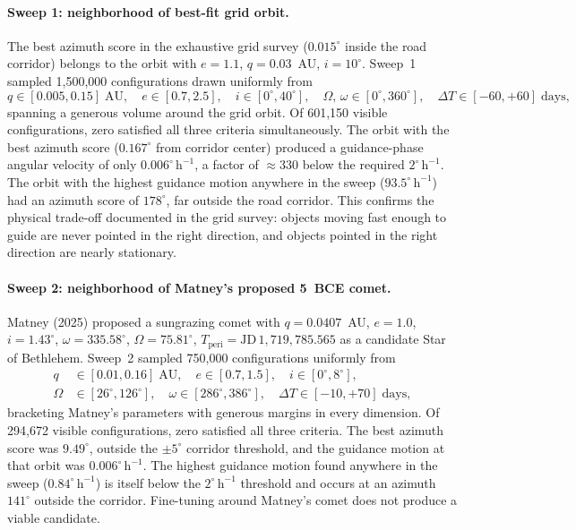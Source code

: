 \documentclass[11pt,a4paper]{article}
\begin{document}
\paragraph{Sweep 1: neighborhood of best-fit grid orbit.}
The best azimuth score in the exhaustive grid survey ($0.015^\circ$
inside the road corridor) belongs to the orbit with $e=1.1$,
$q=0.03$~AU, $i=10^\circ$.
Sweep~1 sampled 1,500,000 configurations drawn uniformly from
\begin{equation}
  q \in [0.005, 0.15]\;\text{AU},\quad
  e \in [0.7, 2.5],\quad
  i \in [0^\circ, 40^\circ],\quad
  \Omega,\,\omega \in [0^\circ, 360^\circ],\quad
  \Delta T \in [-60, +60]\;\text{days},
\end{equation}
spanning a generous volume around the grid orbit.
Of 601,150 visible configurations, zero satisfied all three criteria
simultaneously.
The orbit with the best azimuth score ($0.167^\circ$ from corridor
center) produced a guidance-phase angular velocity of only
$0.006^\circ\,\mathrm{h}^{-1}$, a factor of ${\approx}330$ below the
required $2^\circ\,\mathrm{h}^{-1}$.
The orbit with the highest guidance motion anywhere in the sweep
($93.5^\circ\,\mathrm{h}^{-1}$) had an azimuth score of
$178^\circ$, far outside the road corridor.
This confirms the physical trade-off documented in the grid survey:
objects moving fast enough to guide are never pointed in the right
direction, and objects pointed in the right direction are nearly
stationary.

\paragraph{Sweep 2: neighborhood of Matney's proposed 5~BCE comet.}
Matney (2025)\nocite{matney2025jbaa} proposed a sungrazing comet with
$q=0.0407$~AU, $e=1.0$, $i=1.43^\circ$, $\omega=335.58^\circ$,
$\Omega=75.81^\circ$, $T_\text{peri}=\text{JD}\,1{,}719{,}785.565$
as a candidate Star of Bethlehem.
Sweep~2 sampled 750,000 configurations uniformly from
\begin{equation}
  \begin{aligned}
    q &\in [0.01, 0.16]\;\text{AU},\quad
    e \in [0.7, 1.5],\quad
    i \in [0^\circ, 8^\circ],\quad \\
    \Omega &\in [26^\circ, 126^\circ],\quad
    \omega \in [286^\circ, 386^\circ],\quad
    \Delta T \in [-10, +70]\;\text{days},
  \end{aligned}
\end{equation}
bracketing Matney's parameters with generous margins in every dimension.
Of 294,672 visible configurations, zero satisfied all three criteria.
The best azimuth score was $9.49^\circ$, outside the $\pm5^\circ$
corridor threshold, and the guidance motion at that orbit was
$0.006^\circ\,\mathrm{h}^{-1}$.
The highest guidance motion found anywhere in the sweep ($0.84^\circ\,\mathrm{h}^{-1}$)
is itself below the $2^\circ\,\mathrm{h}^{-1}$ threshold and occurs at an
azimuth $141^\circ$ outside the corridor.
Fine-tuning around Matney's comet does not produce a viable candidate.
\end{document}
